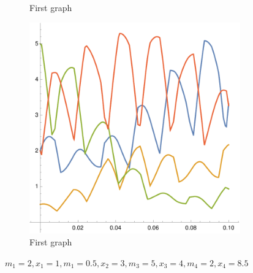 \documentclass[english,master]{liumaiex}
\theoremstyle{plain}
\theoremstyle{definition}
\begin{document}
\begin{figure}[H]
\begin{subfigure}{0.3\textwidth}
        \caption{First graph}
    \end{subfigure}
	\hfill
	\begin{subfigure}{0.3\textwidth}
        \includegraphics[width=\textwidth]{graphs/per4N/m.pdf}
        \caption{First graph}
    \end{subfigure}
    \caption{$m_1 = 2, x_1 = 1, m_1 = 0.5, x_2 = 3, m_3 = 5, x_3 = 4, m_4 = 2, x_4 = 8.5$}
\end{figure}
\end{document}
